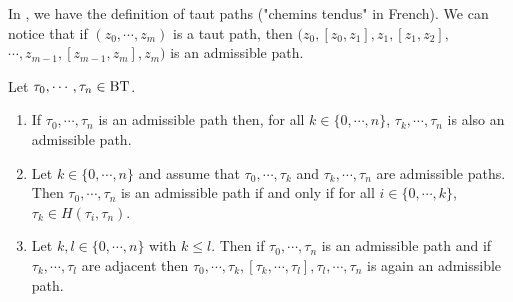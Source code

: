 \documentclass[a4paper,10pt]{amsart}
\begin{document}
\begin{Rem}
\label{remCheminTendu}
In \cite[(2.2.4)]{Wanga}, we have the definition of taut paths ("chemins tendus" in French). We can notice that if $(z_{0},\cdots,z_{m})$ is a taut path, then $(z_{0}, [z_{0},z_{1}], z_{1} ,[z_{1},z_{2}],$  $\cdots ,z_{m-1},[z_{m-1},z_{m}],z_{m})$ is an admissible path.
\end{Rem}


\begin{Lem}
\label{lemCheminsTendus}
Let $\tau_{0},\cdots,\tau_{n} \in \bt$.
\begin{enumerate}
\item If $\tau_{0},\cdots,\tau_{n}$ is an admissible path then, for all $k \in \{0,\cdots,n\}$, $\tau_{k},\cdots,\tau_{n}$ is also an admissible path.
\item Let $k \in \{0,\cdots,n\}$ and assume that $\tau_{0},\cdots,\tau_{k}$ and $\tau_{k},\cdots,\tau_{n}$ are admissible paths. Then $\tau_{0},\cdots,\tau_{n}$ is an admissible path if and only if for all $i \in \{0,\cdots,k\}$, $\tau_{k} \in H(\tau_{i},\tau_{n})$.
\item Let $k,l \in \{0,\cdots,n\}$ with $k \leq l$. Then if $\tau_{0},\cdots,\tau_{n}$ is an admissible path and if $\tau_{k},\cdots,\tau_{l}$ are adjacent then $\tau_{0},\cdots,\tau_{k},[\tau_{k},\cdots,\tau_{l}],\tau_{l},\cdots,\tau_{n}$ is again an admissible path.
\end{enumerate}
\end{Lem}
\end{document}
